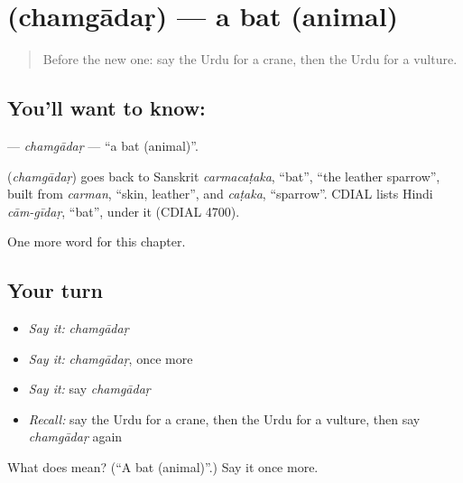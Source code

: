 \section[\texorpdfstring{\ur{چمگادڑ} (chamgādaṛ)}{چمگادڑ (chamgādaṛ)}]{ (chamgādaṛ) — a bat (animal)}

\label{lesson:UR-C208-chamgadar}



\begin{quote}
Before the new one: say the Urdu for a crane, then the Urdu for a vulture.
\end{quote}

\subsection*{You'll want to know: }
\textbf{} — \emph{chamgādaṛ} — \textquotedblleft{}a bat (animal)\textquotedblright{}.

\begin{cousinweb}
\textbf{} (\emph{chamgādaṛ}) goes back to Sanskrit \emph{carmacaṭaka}, \textquotedblleft{}bat\textquotedblright{}, \textquotedblleft{}the leather sparrow\textquotedblright{}, built from \emph{carman}, \textquotedblleft{}skin, leather\textquotedblright{}, and \emph{caṭaka}, \textquotedblleft{}sparrow\textquotedblright{}. CDIAL lists Hindi \emph{cām-gīdaṛ}, \textquotedblleft{}bat\textquotedblright{}, under it (CDIAL 4700).
\end{cousinweb}

\begin{grammarlens}[title={What you've built}]
One more word for this chapter.
\end{grammarlens}

\subsection*{Your turn}
\begin{itemize}
\raggedright
  \item \emph{Say it:} \emph{chamgādaṛ}
  \item \emph{Say it:} \emph{chamgādaṛ}, once more
  \item \emph{Say it:} say \emph{chamgādaṛ}
  \item \emph{Recall:} say the Urdu for a crane, then the Urdu for a vulture, then say \emph{chamgādaṛ} again
\end{itemize}

\begin{tcolorbox}[breakable,colback=teal!4,colframe=teal!35!black,title={Before you move on}]
What does  mean? (\textquotedblleft{}A bat (animal)\textquotedblright{}.) Say it once more.
\end{tcolorbox}
